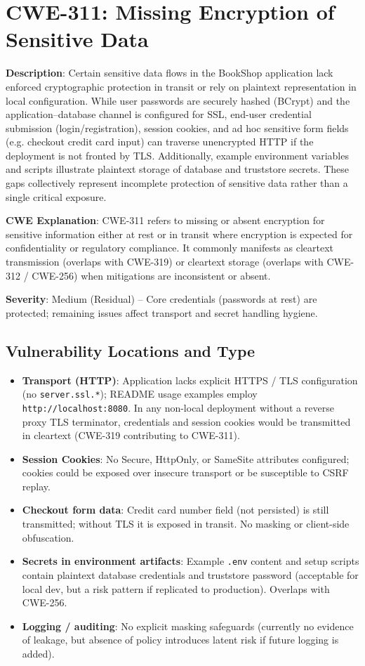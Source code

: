 \documentclass[]{UCD_CS_FYP_Report}
\begin{document}
\section{CWE-311: Missing Encryption of Sensitive Data}

	\textbf{Description}: Certain sensitive data flows in the BookShop application lack enforced cryptographic protection in transit or rely on plaintext representation in local configuration. While user passwords are securely hashed (BCrypt) and the application--database channel is configured for SSL, end-user credential submission (login/registration), session cookies, and ad hoc sensitive form fields (e.g. checkout credit card input) can traverse unencrypted HTTP if the deployment is not fronted by TLS. Additionally, example environment variables and scripts illustrate plaintext storage of database and truststore secrets. These gaps collectively represent incomplete protection of sensitive data rather than a single critical exposure.

	\textbf{CWE Explanation}: CWE-311 refers to missing or absent encryption for sensitive information either at rest or in transit where encryption is expected for confidentiality or regulatory compliance. It commonly manifests as cleartext transmission (overlaps with CWE-319) or cleartext storage (overlaps with CWE-312 / CWE-256) when mitigations are inconsistent or absent.

	\textbf{Severity}: Medium (Residual) -- Core credentials (passwords at rest) are protected; remaining issues affect transport and secret handling hygiene.

\subsection{Vulnerability Locations and Type}
\begin{itemize}
	\item \textbf{Transport (HTTP)}: Application lacks explicit HTTPS / TLS configuration (no \texttt{server.ssl.*}); README usage examples employ \texttt{http://localhost:8080}. In any non-local deployment without a reverse proxy TLS terminator, credentials and session cookies would be transmitted in cleartext (CWE-319 contributing to CWE-311).
	\item \textbf{Session Cookies}: No Secure, HttpOnly, or SameSite attributes configured; cookies could be exposed over insecure transport or be susceptible to CSRF replay.
	\item \textbf{Checkout form data}: Credit card number field (not persisted) is still transmitted; without TLS it is exposed in transit. No masking or client-side obfuscation.
	\item \textbf{Secrets in environment artifacts}: Example \texttt{.env} content and setup scripts contain plaintext database credentials and truststore password (acceptable for local dev, but a risk pattern if replicated to production). Overlaps with CWE-256.
	\item \textbf{Logging / auditing}: No explicit masking safeguards (currently no evidence of leakage, but absence of policy introduces latent risk if future logging is added).
\end{itemize}
\end{document}
